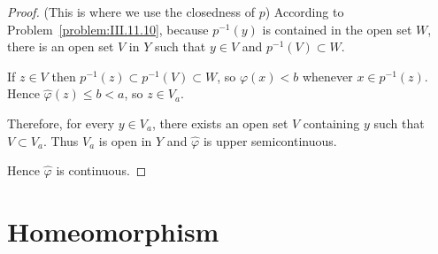 \begin{proof}
    (This is where we use the closedness of \( p \)) According to Problem~\ref{problem:III.11.10}, because \( p^{-1}(y) \) is contained in the open set \( W \), there is an open set \( V \) in \( Y \) such that \( y \in V \) and \( p^{-1}(V) \subset W \).

    If \( z \in V \) then \( p^{-1}(z) \subset p^{-1}(V) \subset W \), so \( \varphi(x) < b \) whenever \( x \in p^{-1}(z) \). Hence \( \hat{\varphi}(z) \le b < a \), so \( z \in V_{a} \).

    Therefore, for every \( y \in V_{a} \), there exists an open set \( V \) containing \( y \) such that \( V \subset V_{a} \). Thus \( V_{a} \) is open in \( Y \) and \( \hat{\varphi} \) is upper semicontinuous.

    \bigskip
    Hence \( \hat{\varphi} \) is continuous.
\end{proof}

\section{Homeomorphism}
